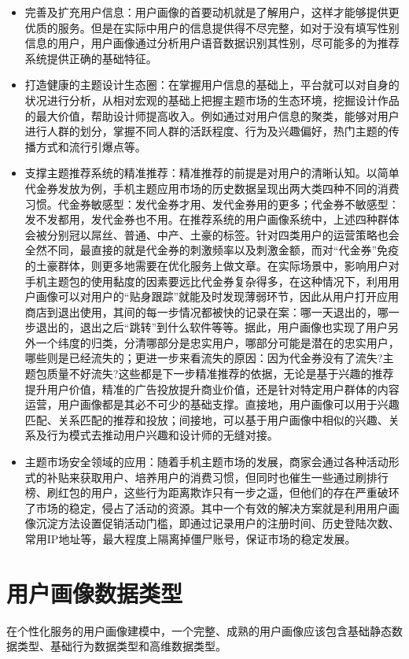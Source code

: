 \begin{itemize}
\item 完善及扩充用户信息：用户画像的首要动机就是了解用户，这样才能够提供更优质的服务。但是在实际中用户的信息提供得不尽完整，如对于没有填写性别信息的用户，用户画像通过分析用户语音数据识别其性别，尽可能多的为推荐系统提供正确的基础特征。
\item 打造健康的主题设计生态圈：在掌握用户信息的基础上，平台就可以对自身的状况进行分析，从相对宏观的基础上把握主题市场的生态环境，挖掘设计作品的最大价值，帮助设计师提高收入。例如通过对用户信息的聚类，能够对用户进行人群的划分，掌握不同人群的活跃程度、行为及兴趣偏好，热门主题的传播方式和流行引爆点等。
\item 支撑主题推荐系统的精准推荐：精准推荐的前提是对用户的清晰认知。以简单代金券发放为例，手机主题应用市场的历史数据呈现出两大类四种不同的消费习惯。代金券敏感型：发代金券才用、发代金券用的更多；代金券不敏感型：发不发都用，发代金券也不用。在推荐系统的用户画像系统中，上述四种群体会被分别冠以屌丝、普通、中产、土豪的标签。针对四类用户的运营策略也会全然不同，最直接的就是代金券的刺激频率以及刺激金额，而对“代金券”免疫的土豪群体，则更多地需要在优化服务上做文章。在实际场景中，影响用户对手机主题包的使用黏度的因素要远比代金券复杂得多，在这种情况下，利用用户画像可以对用户的“贴身跟踪”就能及时发现薄弱环节，因此从用户打开应用商店到退出使用，其间的每一步情况都被快的记录在案：哪一天退出的，哪一步退出的，退出之后“跳转”到什么软件等等。据此，用户画像也实现了用户另外一个纬度的归类，分清哪部分是忠实用户，哪部分可能是潜在的忠实用户，哪些则是已经流失的；更进一步来看流失的原因：因为代金券没有了流失?主题包质量不好流失?这些都是下一步精准推荐的依据，无论是基于兴趣的推荐提升用户价值，精准的广告投放提升商业价值，还是针对特定用户群体的内容运营，用户画像都是其必不可少的基础支撑。直接地，用户画像可以用于兴趣匹配、关系匹配的推荐和投放；间接地，可以基于用户画像中相似的兴趣、关系及行为模式去推动用户兴趣和设计师的无缝对接。
\item 主题市场安全领域的应用：随着手机主题市场的发展，商家会通过各种活动形式的补贴来获取用户、培养用户的消费习惯，但同时也催生一些通过刷排行榜、刷红包的用户，这些行为距离欺诈只有一步之遥，但他们的存在严重破环了市场的稳定，侵占了活动的资源。其中一个有效的解决方案就是利用用户画像沉淀方法设置促销活动门槛，即通过记录用户的注册时间、历史登陆次数、常用IP地址等，最大程度上隔离掉僵尸账号，保证市场的稳定发展。
\end{itemize}

    \section{用户画像数据类型}
    在个性化服务的用户画像建模中，一个完整、成熟的用户画像应该包含基础静态数据类型、基础行为数据类型和高维数据类型。
